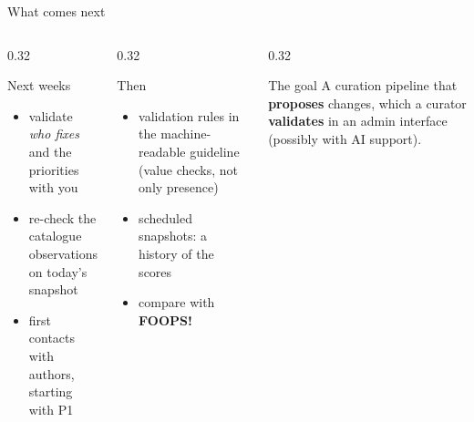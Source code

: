 \documentclass[aspectratio=169,10pt]{beamer}
\begin{document}
\begin{frame}{What comes next}
  \begin{columns}[T]
    \begin{column}{0.32\textwidth}
      \begin{block}{Next weeks}
        \small
        \begin{itemize}
          \item validate \emph{who fixes} and the priorities with you
          \item re-check the catalogue observations on today's snapshot
          \item first contacts with authors, starting with P1
        \end{itemize}
      \end{block}
    \end{column}
    \begin{column}{0.32\textwidth}
      \begin{block}{Then}
        \small
        \begin{itemize}
          \item validation rules in the machine-readable guideline (value checks, not only presence)
          \item scheduled snapshots: a history of the scores
          \item compare with \textbf{FOOPS!}
        \end{itemize}
      \end{block}
    \end{column}
    \begin{column}{0.32\textwidth}
      \begin{exampleblock}{The goal}
        \small A curation pipeline that \textbf{proposes} changes, which a curator
        \textbf{validates} in an admin interface (possibly with AI support).
      \end{exampleblock}
    \end{column}
  \end{columns}
\end{frame}
\end{document}
